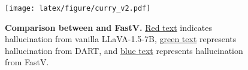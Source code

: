 \newcommand{\highlightedtextred}[1]{%
  \sethlcolor{red!20}%
  \hl{#1}%
}

\newcommand{\highlightedtextblue}[1]{%
  \sethlcolor{cyan!20}%
  \hl{#1}%
}




\begin{figure}[t]
    \centering
    \texttt{[image: latex/figure/curry\_v2.pdf]}
    \vspace{-6mm}
    \caption{\textbf{Comparison between \algname and FastV.} \textcolor{textred}{\ul{Red text}} indicates hallucination from vanilla LLaVA-1.5-7B, \textcolor{textgreen}{\ul{green text}} represents hallucination from DART, and \textcolor{textblue}{\ul{blue text}} represents hallucination from FastV.}
    \vspace{-6mm}
    \label{fig:teaser_curry}
\end{figure}


